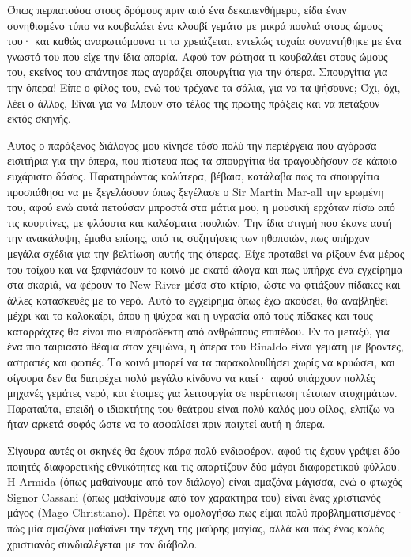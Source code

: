 Όπως περπατούσα στους δρόμους πριν από ένα δεκαπενθήμερο, είδα έναν συνηθισμένο τύπο να κουβαλάει ένα κλουβί γεμάτο με μικρά πουλιά στους ώμους του· και καθώς αναρωτιόμουνα τι τα χρειάζεται, εντελώς τυχαία συναντήθηκε με ένα γνωστό του που είχε την ίδια απορία. Αφού τον ρώτησα τι κουβαλάει στους ώμους του, εκείνος του απάντησε πως αγοράζει σπουργίτια για την όπερα. Σπουργίτια για την όπερα! Είπε ο φίλος του, ενώ του τρέχανε τα σάλια, για να τα ψήσουνε; Όχι, όχι, λέει ο άλλος, Είναι για να Μπουν στο τέλος της πρώτης πράξεις και να πετάξουν εκτός σκηνής.

Αυτός ο παράξενος διάλογος μου κίνησε τόσο πολύ την περιέργεια που αγόρασα εισιτήρια για την όπερα, που πίστευα πως τα σπουργίτια θα τραγουδήσουν σε κάποιο ευχάριστο δάσος. Παρατηρώντας καλύτερα, βέβαια, κατάλαβα πως τα σπουργίτια προσπάθησα να με ξεγελάσουν όπως ξεγέλασε ο Sir Martin Mar-all την ερωμένη του, αφού ενώ αυτά πετούσαν μπροστά στα μάτια μου, η μουσική ερχόταν πίσω από τις κουρτίνες, με φλάουτα και καλέσματα πουλιών. Την ίδια στιγμή που έκανε αυτή την ανακάλυψη, έμαθα επίσης, από τις συζητήσεις των ηθοποιών, πως υπήρχαν μεγάλα σχέδια για την βελτίωση αυτής της όπερας. Είχε προταθεί να ρίξουν ένα μέρος του τοίχου και να ξαφνιάσουν το κοινό με εκατό άλογα και πως υπήρχε ένα εγχείρημα στα σκαριά, να φέρουν το New River μέσα στο κτίριο, ώστε να φτιάξουν πίδακες και άλλες κατασκευές με το νερό. Αυτό το εγχείρημα όπως έχω ακούσει, θα αναβληθεί μέχρι και το καλοκαίρι, όπου η ψύχρα και η υγρασία από τους πίδακες και τους καταρράχτες θα είναι πιο ευπρόσδεκτη από ανθρώπους επιπέδου. Εν το μεταξύ, για ένα πιο ταιριαστό θέαμα στον χειμώνα, η όπερα του Rinaldo είναι γεμάτη με βροντές, αστραπές και φωτιές. Το κοινό μπορεί να τα παρακολουθήσει χωρίς να κρυώσει, και σίγουρα δεν θα διατρέχει πολύ μεγάλο κίνδυνο να καεί· αφού υπάρχουν πολλές μηχανές γεμάτες νερό, και έτοιμες για λειτουργία σε περίπτωση τέτοιων ατυχημάτων. Παραταύτα, επειδή ο ιδιοκτήτης του θεάτρου είναι πολύ καλός μου φίλος, ελπίζω να ήταν αρκετά σοφός ώστε να το ασφαλίσει πριν παιχτεί αυτή η όπερα.

Σίγουρα αυτές οι σκηνές θα έχουν πάρα πολύ ενδιαφέρον, αφού τις έχουν γράψει δύο ποιητές διαφορετικής εθνικότητες και τις απαρτίζουν δύο μάγοι διαφορετικού φύλλου. Η Armida (όπως μαθαίνουμε από τον διάλογο) είναι αμαζόνα μάγισσα, ενώ ο φτωχός Signor Cassani (όπως μαθαίνουμε από τον χαρακτήρα του) είναι ένας χριστιανός μάγος (Mago Christiano). Πρέπει να ομολογήσω πως είμαι πολύ προβληματισμένος· πώς μία αμαζόνα μαθαίνει την τέχνη της μαύρης μαγίας, αλλά και πώς ένας καλός χριστιανός συνδιαλέγεται με τον διάβολο.

